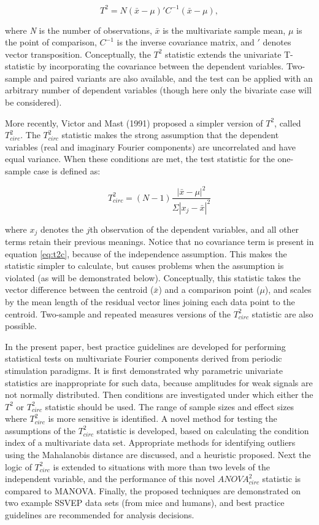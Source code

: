 \documentclass[]{article}
\begin{document}
\begin{equation}
\label{eq:t2eq}
T^2 = N(\bar{x} - \mu)' C^{-1} (\bar{x} - \mu),
\end{equation}

where \emph{N} is the number of observations, \(\bar{x}\) is the multivariate sample mean, \(\mu\) is the point of comparison, \(C^{-1}\) is the inverse covariance matrix, and \('\) denotes vector transposition. Conceptually, the \(T^2\) statistic extends the univariate T-statistic by incorporating the covariance between the dependent variables. Two-sample and paired variants are also available, and the test can be applied with an arbitrary number of dependent variables (though here only the bivariate case will be considered).

More recently, Victor and Mast (1991) proposed a simpler version of \(T^2\), called \(T^2_{circ}\). The \(T^2_{circ}\) statistic makes the strong assumption that the dependent variables (real and imaginary Fourier components) are uncorrelated and have equal variance. When these conditions are met, the test statistic for the one-sample case is defined as:

\begin{equation}
\label{eq:t2c}
T^2_{circ} = (N-1)\frac{|\bar{x}-\mu|^2}{\Sigma|x_j - \bar{x}|^2}
\end{equation}

where \(x_j\) denotes the \(j\)th observation of the dependent variables, and all other terms retain their previous meanings. Notice that no covariance term is present in equation \eqref{eq:t2c}, because of the independence assumption. This makes the statistic simpler to calculate, but causes problems when the assumption is violated (as will be demonstrated below). Conceptually, this statistic takes the vector difference between the centroid (\(\bar{x}\)) and a comparison point (\(\mu\)), and scales by the mean length of the residual vector lines joining each data point to the centroid. Two-sample and repeated measures versions of the \(T^2_{circ}\) statistic are also possible.

In the present paper, best practice guidelines are developed for performing statistical tests on multivariate Fourier components derived from periodic stimulation paradigms. It is first demonstrated why parametric univariate statistics are inappropriate for such data, because amplitudes for weak signals are not normally distributed. Then conditions are investigated under which either the \(T^2\) or \(T^2_{circ}\) statistic should be used. The range of sample sizes and effect sizes where \(T^2_{circ}\) is more sensitive is identified. A novel method for testing the assumptions of the \(T^2_{circ}\) statistic is developed, based on calculating the condition index of a multivariate data set. Appropriate methods for identifying outliers using the Mahalanobis distance are discussed, and a heuristic proposed. Next the logic of \(T^2_{circ}\) is extended to situations with more than two levels of the independent variable, and the performance of this novel \(ANOVA^2_{circ}\) statistic is compared to MANOVA. Finally, the proposed techniques are demonstrated on two example SSVEP data sets (from mice and humans), and best practice guidelines are recommended for analysis decisions.
\end{document}

